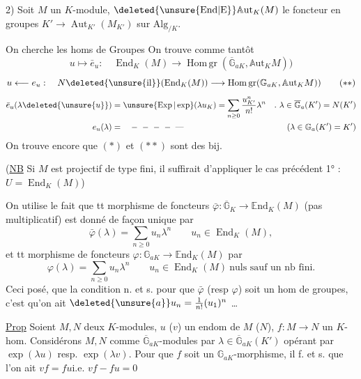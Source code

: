 2) Soit $M$ un $K$-module, $\deleted{\unsure{\mathrm{End}|\mathrm E}}\mathbb A\mathrm{ut}_K(M)$  le foncteur en groupes $K'\longrightarrow\operatorname{Aut}_{K'}(M_{K'})$ sur $\mathrm{Alg}_{/K}$.

On cherche les homs de Groupes
On trouve comme tantôt
\[
u\longmapsto\bar e_u:\quad \operatorname{End}_K(M)\longrightarrow
\operatorname{Hom\,gr}(\overline{\mathbb G}_{aK},\mathbb A\mathrm{ut}_K M))\tag*{($*$)}
\]
\[
u\longleftarrow e_u:\quad N\deleted{\unsure{\mathrm{il}}}(\operatorname{End}_K(M))
\longrightarrow\operatorname{Hom\,gr}(\mathbb G_{aK},\mathbb A\mathrm{ut}_K M))\tag*{($**$)}
\]
\[
\begin{aligned}
\bar e_u(\lambda\deleted{\unsure{u}})&=\unsure{\operatorname{Exp}|\exp}(\lambda u_K)=
\sum_{n\geq0}\frac{u^n_{K'}}{n!}\lambda^n
&.\ \lambda\in\overline{\mathbb G}_a(K')=N(K')\\
e_u(\lambda)&=\quad-\ -\ -\ -\ \text{---}
&(\lambda\in\mathbb G_a(K')=K')
\end{aligned}
\]
On trouve encore que $(*)$ et $(**)$ sont des bij.

(\uline{NB} Si $M$ est projectif de type fini, il suffirait d'appliquer le cas précédent 1° : $U=\operatorname{End}_K(M)$)

On utilise le fait que tt morphisme de foncteurs $\bar\varphi:\overline{\mathbb G}_K\longrightarrow\mathbb E\mathrm{nd}_K(M)$ (pas  multiplicatif) est donné de façon unique par
\[
\bar\varphi(\lambda)=\sum_{n\geq0}u_n\lambda^n\qquad u_n\in\operatorname{End}_K(M),
\]
et tt morphisme de foncteurs $\varphi:\mathbb G_{aK}\to\mathbb E\mathrm{nd}_K(M)$ par
\[
\varphi(\lambda)=\sum_{n\geq0}u_n\lambda^n\qquad u_n\in\operatorname{End}_K(M)\ \text{nuls sauf un nb fini.}
\]
Ceci posé,  que la condition n. et s. pour que $\bar\varphi$ (resp $\varphi$) soit un hom de groupes, c'est qu'on ait $\deleted{\unsure{a}}u_n=\frac1{n!}(u_1)^n$ \ldots

\uline{Prop} Soient $M,N$ deux $K$-modules, $u$ ($v$) un endom de $M$ ($N$), $f:M\longrightarrow N$ un $K$-hom. Considérons $M,N$ comme $\overline{\mathbb G}_{aK}$-modules par $\lambda\in\overline{\mathbb G}_{aK}(K')$ opérant par $\exp(\lambda u)$ resp. $\exp(\lambda v)$. Pour que $f$ soit un $\mathbb G_{aK}$-morphisme, il f. et s. que l'on ait $vf=fu$\quad i.e. $vf-fu=0$

